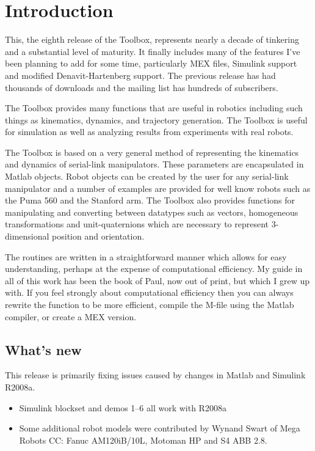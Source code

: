 \documentclass{article}
\begin{document}
\section{Introduction}
This, the eighth release of the Toolbox, represents nearly a decade of %
tinkering and a substantial level of maturity.  It finally includes many of
the features I've been planning to add for some time, particularly MEX files,
Simulink support and modified Denavit-Hartenberg support.
The previous release has had thousands of downloads and the mailing list 
has hundreds of subscribers.

The Toolbox provides many functions that are useful in robotics
including such things as kinematics, dynamics, and  trajectory generation.
The Toolbox is useful for simulation as well as analyzing results from
experiments with real robots.

The Toolbox is based on a very general method of representing the kinematics
and dynamics of serial-link manipulators.
These parameters  are encapsulated in Matlab objects.  Robot objects
can be created by the user for any serial-link manipulator and a number
of examples are provided for well know robots such as the Puma 560 and the
Stanford arm.
The Toolbox also provides functions for manipulating and converting
between datatypes such
as vectors, homogeneous transformations and unit-quaternions which are necessary
to represent 3-dimensional position and orientation.

The routines are written in a straightforward manner which allows
for easy understanding, perhaps at the expense of computational efficiency.
My guide in all of this work has been the book of Paul\cite{Paul81a}, now
out of print, but which I grew up with.
If you feel strongly about computational efficiency then you can always
rewrite the function to be more efficient,
compile the M-file using the Matlab compiler, or
create a MEX version.

\subsection{What's new}
This release is primarily fixing issues caused by changes in Matlab and Simulink
R2008a.
\begin{itemize}
\item	Simulink blockset and demos 1--6 all work with R2008a
\item   Some additional robot models were contributed by Wynand Swart of Mega Robots CC:
Fanuc AM120iB/10L, Motoman HP and S4 ABB 2.8.
\end{itemize}
\end{document}
